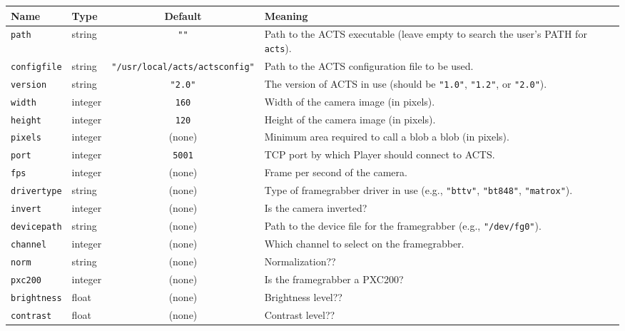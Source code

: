 \begin{center}
{\small \begin{tabularx}{\columnwidth}{|l|l|c|X|}
\hline
Name & Type & Default & Meaning\\
\hline
{\tt path} & string & {\tt ""} & Path to the ACTS executable (leave empty to
search the user's PATH for {\tt acts}).\\

{\tt configfile} & string & {\tt "/usr/local/acts/actsconfig"} & Path to the
ACTS configuration file to be used.\\

{\tt version} & string & {\tt "2.0"} & The version of ACTS in use (should be
{\tt "1.0"}, {\tt "1.2"}, or {\tt "2.0"}).\\

{\tt width} & integer & {\tt 160} & Width of the camera image (in pixels).\\

{\tt height} & integer & {\tt 120} & Height of the camera image (in pixels).\\

{\tt pixels} & integer & (none) & Minimum area required to call a blob a blob 
(in pixels).\\

{\tt port} & integer & {\tt 5001} & TCP port by which Player should connect to
ACTS.\\

{\tt fps} & integer & (none) & Frame per second of the camera.\\

{\tt drivertype} & string & (none) & Type of framegrabber driver in use (e.g.,
{\tt "bttv"}, {\tt "bt848"}, {\tt "matrox"}).\\

{\tt invert} & integer & (none) & Is the camera inverted?\\

{\tt devicepath} & string & (none) & Path to the device file for the
framegrabber (e.g., {\tt "/dev/fg0"}).\\

{\tt channel} & integer & (none) & Which channel to select on the
framegrabber.\\

{\tt norm} & string & (none) & Normalization??\\

{\tt pxc200} & integer & (none) & Is the framegrabber a PXC200?\\

{\tt brightness} & float & (none) & Brightness level??\\

{\tt contrast} & float & (none) & Contrast level??\\
\hline
\end{tabularx}}
\end{center}

